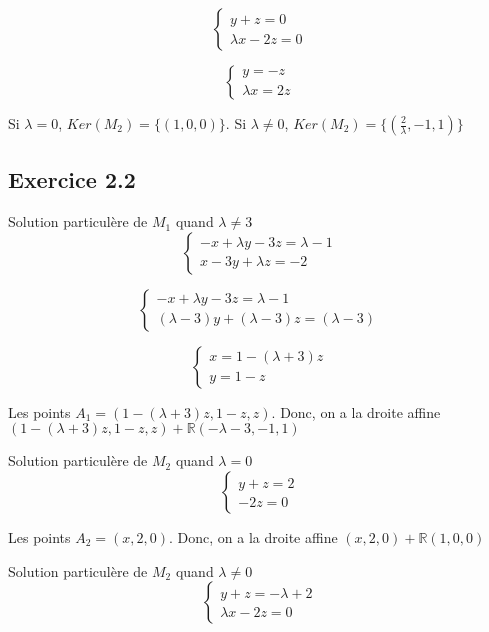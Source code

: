 \documentclass[]{book}
\theoremstyle{definition}
\newcommand{\bb}[1]{\mathbb{#1}}
\newcommand{\R}{\bb{R}}
\begin{document}
$$
\left\{ 
    \begin{array}{l}
        y + z = 0 \\
        \lambda x - 2 z = 0
    \end{array}
\right.
$$

$$
\left\{ 
    \begin{array}{l}
        y = -z \\
        \lambda x = 2 z
    \end{array}
\right.
$$

Si $\lambda = 0$, $Ker(M_2) =\{(1,0,0) \}$. Si $\lambda \neq 0$, $Ker(M_2) =\{(\frac{2}{\lambda},-1,1) \}$

\subsection*{Exercice 2.2}
Solution particul\`ere de $M_1$ quand $\lambda \neq 3$
$$
\left\{ 
    \begin{array}{l}
        -x + \lambda y - 3 z = \lambda - 1 \\
        x - 3 y + \lambda z = -2
    \end{array}
\right.
$$

$$
\left\{ 
    \begin{array}{l}
        -x + \lambda y - 3 z = \lambda - 1 \\
        (\lambda - 3) y + (\lambda - 3) z = (\lambda - 3)
    \end{array}
\right.
$$

$$
\left\{ 
    \begin{array}{l}
        x  = 1 - (\lambda + 3) z\\
         y = 1-z
    \end{array}
\right.
$$

Les points $A_1 = (1 - (\lambda + 3) z, 1-z, z)$. Donc, on a la droite affine $(1 - (\lambda + 3) z, 1-z, z) + \R(-\lambda -3, -1, 1)$

Solution particul\`ere de $M_2$ quand $\lambda = 0$
$$
\left\{ 
    \begin{array}{l}
        y+z  = 2\\
        -2z = 0
    \end{array}
\right.
$$

Les points $A_2 = (x,2,0)$. Donc, on a la droite affine $(x,2,0) + \R(1,0,0)$


Solution particul\`ere de $M_2$ quand $\lambda \neq 0$
$$
\left\{ 
    \begin{array}{l}
        y+z  = -\lambda + 2\\
        \lambda x -2z = 0
    \end{array}
\right.
$$
\end{document}

